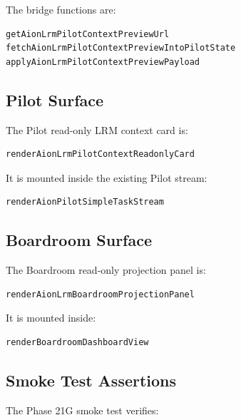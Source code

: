 The bridge functions are:

\begin{verbatim}
getAionLrmPilotContextPreviewUrl
fetchAionLrmPilotContextPreviewIntoPilotState
applyAionLrmPilotContextPreviewPayload
\end{verbatim}

\subsection{Pilot Surface}

The Pilot read-only LRM context card is:

\begin{verbatim}
renderAionLrmPilotContextReadonlyCard
\end{verbatim}

It is mounted inside the existing Pilot stream:

\begin{verbatim}
renderAionPilotSimpleTaskStream
\end{verbatim}

\subsection{Boardroom Surface}

The Boardroom read-only projection panel is:

\begin{verbatim}
renderAionLrmBoardroomProjectionPanel
\end{verbatim}

It is mounted inside:

\begin{verbatim}
renderBoardroomDashboardView
\end{verbatim}

\subsection{Smoke Test Assertions}

The Phase 21G smoke test verifies:

